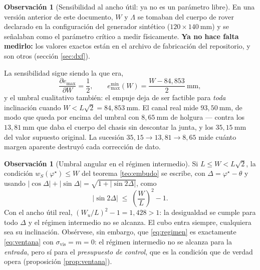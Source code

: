 \documentclass[11pt,a4paper]{article}
\theoremstyle{definition}
\newtheorem{observacion}[teorema]{Observación}
\begin{document}
\begin{observacion}[Sensibilidad al ancho útil: ya no es un parámetro libre]
\label{obs:medirW}
En una versión anterior de este documento, $W$ y $\Lambda$ se tomaban del cuerpo de rover
declarado en la configuración del generador sintético ($120 \times 140\ \mathrm{mm}$) y
se señalaban como el parámetro crítico a medir físicamente. \textbf{Ya no hace falta
medirlo:} los valores exactos están en el archivo de fabricación del repositorio, y son
otros (sección \ref{sec:dxf}).

La sensibilidad sigue siendo la que era,
\[
  \frac{\partial e_{\max}}{\partial W} = \frac{1}{2},
  \qquad
  e_{\max}^{\min}(W) = \frac{W - 84{,}853}{2}\ \mathrm{mm},
\]
y el umbral cualitativo también: el empuje deja de ser factible para \emph{toda}
inclinación cuando $W < L\sqrt2 = 84{,}853\ \mathrm{mm}$. El canal real mide
$93{,}50\ \mathrm{mm}$, de modo que queda por encima del umbral con
$8{,}65\ \mathrm{mm}$ de holgura --- contra los $13{,}81\ \mathrm{mm}$ que daba el cuerpo
del chasis sin descontar la junta, y los $35{,}15\ \mathrm{mm}$ del valor supuesto
original. La sucesión $35{,}15 \to 13{,}81 \to 8{,}65$ mide cuánto margen aparente
destruyó cada corrección de dato.
\end{observacion}

\begin{observacion}[Umbral angular en el régimen intermedio]
Si $L \le W < L\sqrt2$, la condición $w_S(\varphi^\star)\le W$ del
teorema \ref{teo:embudo} se escribe, con $\Delta = \varphi^\star-\theta$ y usando
$|\cos\Delta| + |\sin\Delta| = \sqrt{1+|\sin 2\Delta|}$, como
\begin{equation}
  \big|\sin 2\Delta\big| \;\le\; \left(\frac{W}{L}\right)^{\!2} - 1 .
  \label{eq:regimen}
\end{equation}
Con el ancho útil real, $(W_u/L)^2 - 1 = 1{,}428 > 1$: la desigualdad se cumple para
todo $\Delta$ y el régimen intermedio no se alcanza. El cubo entra siempre, cualquiera
sea su inclinación. Obsérvese, sin embargo, que \eqref{eq:regimen} es exactamente
\eqref{eq:ventana} con $\sigma_{\mathrm{vis}} = m = 0$: el régimen intermedio no se
alcanza para la \emph{entrada}, pero sí para el \emph{presupuesto de control}, que es la
condición que de verdad opera (proposición \ref{prop:ventana}).
\end{observacion}
\end{document}
